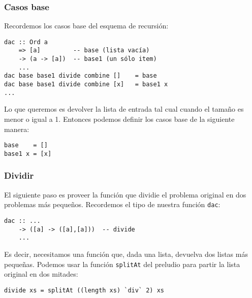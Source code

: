 \documentclass[spanish]{beamer}
\begin{document}
\begin{frame}[fragile]
  \frametitle{Casos base}

  Recordemos los casos base del esquema de recursión:

  \vspace{1em}

  \begin{Verbatim}
dac :: Ord a
    => [a]         -- base (lista vacía)
    -> (a -> [a])  -- base1 (un sólo item)
    ...
dac base base1 divide combine []    = base
dac base base1 divide combine [x]   = base1 x
...
  \end{Verbatim}

  \vspace{1em}

  Lo que queremos es devolver la lista de entrada tal cual cuando el tamaño es
  menor o igual a 1. Entonces podemos definir los casos base de la siguiente
  manera:

  \vspace{1em}

  \begin{Verbatim}
base    = []
base1 x = [x]
  \end{Verbatim}
\end{frame}

\begin{frame}[fragile]
  \frametitle{Dividir}

  El siguiente paso es proveer la función que dividie el problema original en
  dos problemas más pequeños. Recordemos el tipo de nuestra función
  \texttt{dac}:

  \vspace{1em}

  \begin{Verbatim}
dac :: ...
    -> ([a] -> ([a],[a]))  -- divide
    ...
  \end{Verbatim}

  \vspace{1em}

  Es decir, necesitamos una función que, dada una lista, devuelva dos listas
  más pequeñas. Podemos usar la función \texttt{splitAt} del preludio para
  partir la lista original en dos mitades:

  \vspace{1em}

  \begin{Verbatim}
divide xs = splitAt ((length xs) `div` 2) xs
  \end{Verbatim}
\end{frame}
\end{document}
